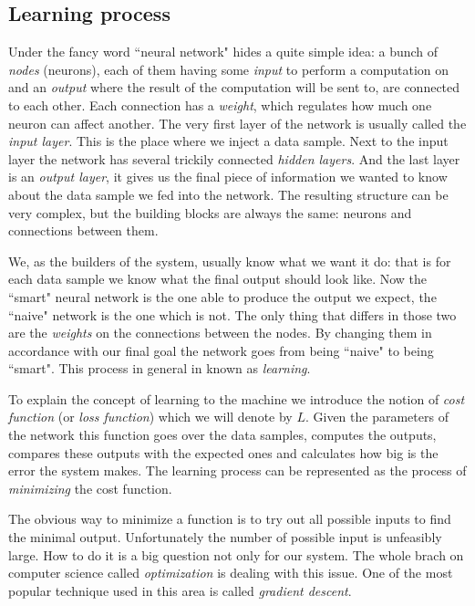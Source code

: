 \documentclass[a4paper,12pt]{article}
\begin{document}
\subsection{Learning process}
\label{sec:learningprocess}
Under the fancy word ``neural network" hides a quite simple idea: a bunch of \emph{nodes} (neurons), each of them having some \emph{input} to perform a computation on and an \emph{output} where the result of the computation will be sent to, are connected to each other. Each connection has a \emph{weight}, which regulates how much one neuron can affect another. The very first layer of the network is usually called the \emph{input layer}. This is the place where we inject a data sample. Next to the input layer the network has several trickily connected \emph{hidden layers}. And the last layer is an \emph{output layer}, it gives us the final piece of information we wanted to know about the data sample we fed into the network. The resulting structure can be very complex, but the building blocks are always the same: neurons and connections between them.

We, as the builders of the system, usually know what we want it do: that is for each data sample we know what the final output should look like. Now the ``smart" neural network is the one able to produce the output we expect, the ``naive" network is the one which is not. The only thing that differs in those two are the \emph{weights} on the connections between the nodes. By changing them in accordance with our final goal the network goes from being ``naive" to being ``smart". This process in general in known as \emph{learning}.

To explain the concept of learning to the machine we introduce the notion of \emph{cost function} (or \emph{loss function}) which we will denote by $L$. Given the parameters of the network this function goes over the data samples, computes the outputs, compares these outputs with the expected ones and calculates how big is the error the system makes. The learning process can be represented as the process of \emph{minimizing} the cost function.

The obvious way to minimize a function is to try out all possible inputs to find the minimal output. Unfortunately the number of possible input is unfeasibly large. How to do it is a big question not only for our system. The whole brach on computer science called \emph{optimization} is dealing with this issue. One of the most popular technique used in this area is called \emph{gradient descent}.
\end{document}
